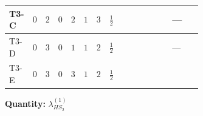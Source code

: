\documentclass[8pt]{article}
\begin{document}
\begin{landscape}
\begin{longtable}{@{}llcccccc >{\raggedright\arraybackslash}p{0.21\linewidth} >{\raggedright\arraybackslash}p{0.21\linewidth} >{\raggedright\arraybackslash}p{0.21\linewidth}@{}}
\midrule
T3-C & $0$ & $2$ & $0$ & $2$ & $1$ & $3$ & $\frac{1}{2}$ & \scriptsize\adjustbox{max width=\linewidth}{$\begin{gathered} +4 {\lambda_{HS_2}^{(1)}}^2\end{gathered}$} & \scriptsize\adjustbox{max width=\linewidth}{$\begin{gathered} +6 {\lambda_{HS_2}^{(1)}} {\lambda_{S_2}^{(1)}}\end{gathered}$} & --- \\
\midrule
T3-D & $0$ & $3$ & $0$ & $1$ & $1$ & $2$ & $\frac{1}{2}$ & \scriptsize\adjustbox{max width=\linewidth}{$\begin{gathered} +4 {\lambda_{HS_2}^{(1)}}^2\end{gathered}$} & \scriptsize\adjustbox{max width=\linewidth}{$\begin{gathered} +4 {\lambda_{HS_2}^{(1)}} {\lambda_{S_2}^{(1)}}\end{gathered}$} & --- \\
\midrule
T3-E & $0$ & $3$ & $0$ & $3$ & $1$ & $2$ & $\frac{1}{2}$ & \scriptsize\adjustbox{max width=\linewidth}{$\begin{gathered} +4 {\lambda_{HS_2}^{(1)}}^2\end{gathered}$} & \scriptsize\adjustbox{max width=\linewidth}{$\begin{gathered} +8 {\lambda_{HS_2}^{(1)}} {\lambda_{S_2}^{(1)}}\end{gathered}$} & \scriptsize\adjustbox{max width=\linewidth}{$\begin{gathered} +6 {\lambda_{HS_2}^{(A)}}^2\end{gathered}$} \\
\midrule
\bottomrule
\end{longtable}
\clearpage
\noindent\textbf{Quantity: }$\lambda_{HS_2}^{(1)}$\par\smallskip

\end{landscape}
\end{document}
